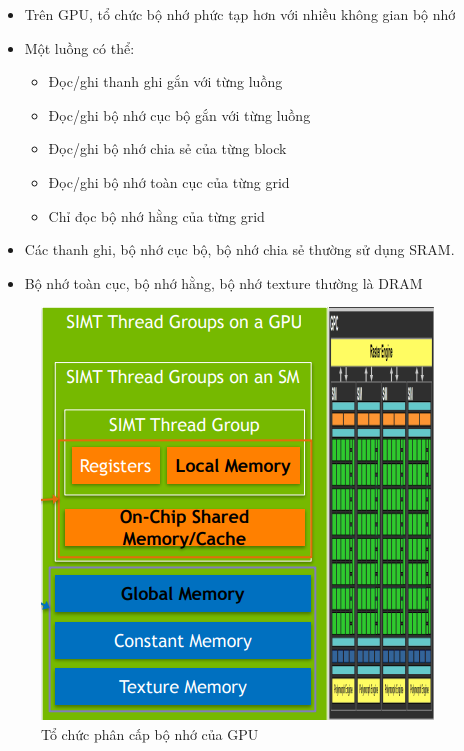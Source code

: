 \documentclass[14pt, a4paper]{article}
\numberwithin{equation}{section}
\numberwithin{figure}{section}
\numberwithin{dl}{section}
\numberwithin{md}{section}
\numberwithin{bd}{section}
\numberwithin{dn}{section}
\numberwithin{hq}{section}
\begin{document}
\begin{itemize}
    \item Trên GPU, tổ chức bộ nhớ phức tạp hơn với nhiều không gian bộ nhớ
    \item Một luồng có thể:
    \begin{itemize}
        \item Đọc/ghi thanh ghi gắn với từng luồng 
        \item Đọc/ghi bộ nhớ cục bộ gắn với từng luồng 
        \item Đọc/ghi bộ nhớ chia sẻ của từng block 
        \item Đọc/ghi bộ nhớ toàn cục của từng grid 
        \item Chỉ đọc bộ nhớ hằng của từng grid
    \end{itemize}
\end{itemize}

\begin{itemize}
    \item Các thanh ghi, bộ nhớ cục bộ, bộ nhớ chia sẻ thường sử dụng SRAM.
    \item Bộ nhớ toàn cục, bộ nhớ hằng, bộ nhớ texture thường là DRAM
\end{itemize}

\begin{figure}[H]
    \centering
    \includegraphics[width=0.6\linewidth]{figures/CUDA/GPU_Memory_Hierachy.png}
    \caption{Tổ chức phân cấp bộ nhớ của GPU}
\end{figure}
\end{document}
